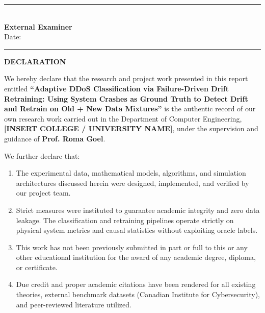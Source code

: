 \documentclass[12pt,a4paper,oneside]{report}
\begin{document}
\vspace{2.5cm}

\noindent
\begin{minipage}{\textwidth}
\begin{center}
\rule{6cm}{0.4pt}\\[0.2cm]
\textbf{External Examiner}\\[0.1cm]
Date: \rule{4cm}{0.4pt}
\end{center}
\end{minipage}

\newpage
\thispagestyle{plain}
\begin{center}
{\LARGE \textbf{DECLARATION}}\\[1.0cm]
\end{center}

\noindent We hereby declare that the research and project work presented in this report entitled \textbf{``Adaptive DDoS Classification via Failure-Driven Drift Retraining: Using System Crashes as Ground Truth to Detect Drift and Retrain on Old + New Data Mixtures''} is the authentic record of our own research work carried out in the Department of Computer Engineering, \textbf{[INSERT COLLEGE / UNIVERSITY NAME]}, under the supervision and guidance of \textbf{Prof. Roma Goel}.

\vspace{0.6cm}
\noindent We further declare that:
\begin{enumerate}
    \item The experimental data, mathematical models, algorithms, and simulation architectures discussed herein were designed, implemented, and verified by our project team.
    \item Strict measures were instituted to guarantee academic integrity and zero data leakage. The classification and retraining pipelines operate strictly on physical system metrics and causal statistics without exploiting oracle labels.
    \item This work has not been previously submitted in part or full to this or any other educational institution for the award of any academic degree, diploma, or certificate.
    \item Due credit and proper academic citations have been rendered for all existing theories, external benchmark datasets (Canadian Institute for Cybersecurity), and peer-reviewed literature utilized.
\end{enumerate}

\vspace{2.5cm}
\end{document}
